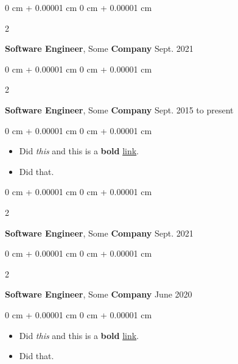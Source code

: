 \documentclass[10pt, letterpaper]{article}
\newenvironment{highlights}{
    \begin{itemize}[
        topsep=0.10 cm,
        parsep=0.10 cm,
        partopsep=0pt,
        itemsep=0pt,
        leftmargin=0 cm + 10pt
    ]
}{
    \end{itemize}
} %
\newenvironment{onecolentry}{
    \begin{adjustwidth}{
        0 cm + 0.00001 cm
    }{
        0 cm + 0.00001 cm
    }
}{
    \end{adjustwidth}
} %
\newenvironment{twocolentry}[2][]{
    \onecolentry
    \def\secondColumn{#2}
    \setcolumnwidth{\fill, 4.5 cm}
    \begin{paracol}{2}
}{
    \switchcolumn \raggedleft \secondColumn
    \end{paracol}
    \endonecolentry
} %
\begin{document}
        \vspace{0.2 cm}

        \begin{twocolentry}{
            Sept. 2021
        }
            \textbf{Software Engineer}, Some \textbf{Company}\end{twocolentry}



        \vspace{0.2 cm}

        \begin{twocolentry}{
            Sept. 2015 to present
        }
            \textbf{Software Engineer}, Some \textbf{Company}\end{twocolentry}

        \vspace{0.10 cm}
        \begin{onecolentry}
            \begin{highlights}
                \item Did \textit{this} and this is a \textbf{bold} \href{https://example.com}{link}.
                \item Did that.
            \end{highlights}
        \end{onecolentry}


        \vspace{0.2 cm}

        \begin{twocolentry}{
            Sept. 2021
        }
            \textbf{Software Engineer}, Some \textbf{Company}\end{twocolentry}



        \vspace{0.2 cm}

        \begin{twocolentry}{
            June 2020
        }
            \textbf{Software Engineer}, Some \textbf{Company}\end{twocolentry}

        \vspace{0.10 cm}
        \begin{onecolentry}
            \begin{highlights}
                \item Did \textit{this} and this is a \textbf{bold} \href{https://example.com}{link}.
                \item Did that.
            \end{highlights}
        \end{onecolentry}
\end{document}
